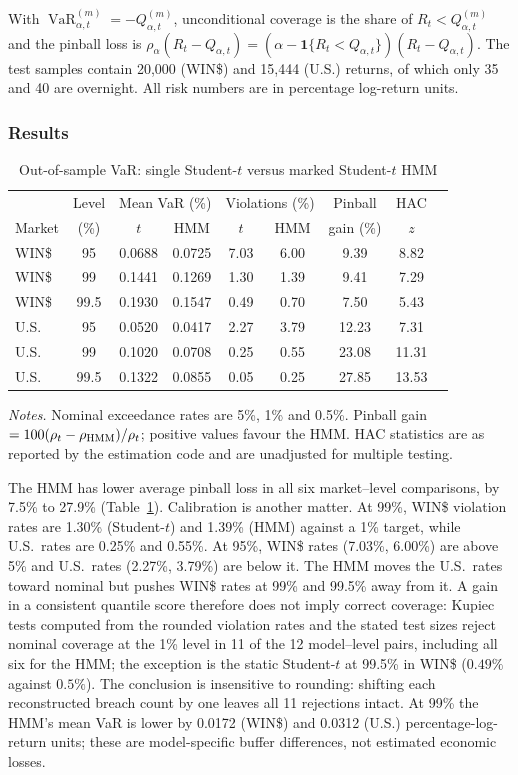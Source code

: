 \documentclass[11pt,a4paper]{article}
\DeclareMathOperator{\VaR}{VaR}
\theoremstyle{plain}
\theoremstyle{remark}
\begin{document}
With $\VaR^{(m)}_{\alpha,t}=-Q^{(m)}_{\alpha,t}$, unconditional coverage is the share of $R_t<Q^{(m)}_{\alpha,t}$ and the pinball loss is $\rho_\alpha(R_t-Q_{\alpha,t})=(\alpha-\mathbf 1\{R_t<Q_{\alpha,t}\})(R_t-Q_{\alpha,t})$. The test samples contain 20{,}000 (WIN\$) and 15{,}444 (U.S.) returns, of which only 35 and 40 are overnight. All risk numbers are in percentage log-return units.

\subsubsection{Results}
\begin{table}[ht]
\centering\small
\caption{Out-of-sample VaR: single Student-$t$ versus marked Student-$t$ HMM}\label{tab:var}
\begin{tabular}{lcccccccc}
\toprule
 & Level & \multicolumn{2}{c}{Mean VaR (\%)} & \multicolumn{2}{c}{Violations (\%)} & Pinball & HAC\\
Market & (\%) & $t$ & HMM & $t$ & HMM & gain (\%) & $z$\\
\midrule
WIN\$ & 95 & 0.0688 & 0.0725 & 7.03 & 6.00 & 9.39 & 8.82\\
WIN\$ & 99 & 0.1441 & 0.1269 & 1.30 & 1.39 & 9.41 & 7.29\\
WIN\$ & 99.5 & 0.1930 & 0.1547 & 0.49 & 0.70 & 7.50 & 5.43\\
U.S. & 95 & 0.0520 & 0.0417 & 2.27 & 3.79 & 12.23 & 7.31\\
U.S. & 99 & 0.1020 & 0.0708 & 0.25 & 0.55 & 23.08 & 11.31\\
U.S. & 99.5 & 0.1322 & 0.0855 & 0.05 & 0.25 & 27.85 & 13.53\\
\bottomrule
\end{tabular}
\par\smallskip\footnotesize\emph{Notes.} Nominal exceedance rates are 5\%, 1\% and 0.5\%. Pinball gain $=100(\rho_t-\rho_{\rm HMM})/\rho_t$; positive values favour the HMM. HAC statistics are as reported by the estimation code and are unadjusted for multiple testing.
\end{table}

The HMM has lower average pinball loss in all six market--level comparisons, by 7.5\% to 27.9\% (Table~\ref{tab:var}). Calibration is another matter. At 99\%, WIN\$ violation rates are 1.30\% (Student-$t$) and 1.39\% (HMM) against a 1\% target, while U.S.\ rates are 0.25\% and 0.55\%. At 95\%, WIN\$ rates (7.03\%, 6.00\%) are above 5\% and U.S.\ rates (2.27\%, 3.79\%) are below it. The HMM moves the U.S.\ rates toward nominal but pushes WIN\$ rates at 99\% and 99.5\% away from it. A gain in a consistent quantile score therefore does not imply correct coverage: Kupiec tests computed from the rounded violation rates and the stated test sizes reject nominal coverage at the 1\% level in 11 of the 12 model--level pairs, including all six for the HMM; the exception is the static Student-$t$ at 99.5\% in WIN\$ ($0.49\%$ against $0.5\%$). The conclusion is insensitive to rounding: shifting each reconstructed breach count by one leaves all 11 rejections intact. At 99\% the HMM's mean VaR is lower by 0.0172 (WIN\$) and 0.0312 (U.S.) percentage-log-return units; these are model-specific buffer differences, not estimated economic losses.
\end{document}
